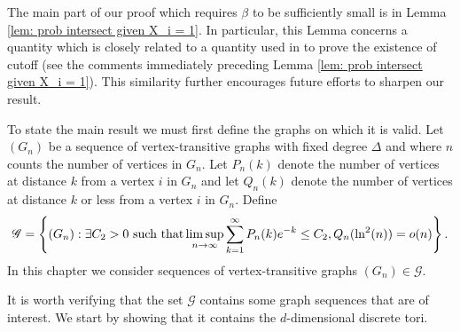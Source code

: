 The main part of our proof which requires $\beta$ to be sufficiently small is in Lemma \ref{lem: prob intersect given X_i = 1}. In particular, this Lemma concerns a quantity which is closely related to a quantity used in \cite{Lubetzky2015-po} to prove the existence of cutoff (see the comments immediately preceding Lemma \ref{lem: prob intersect given X_i = 1}). This similarity further encourages future efforts to sharpen our result.

To state the main result we must first define the graphs on which it is valid. Let $(G_{n})$ be a sequence of vertex-transitive graphs with fixed degree $\Delta$ and where $n$ counts the number of vertices in $G_n$. Let $P_n(k)$ denote the number of vertices at distance $k$ from a vertex $i$ in $G_n$ and let $Q_n(k)$ denote the number of vertices at distance $k$ or less from a vertex $i$ in $G_n$. Define
\begin{equation}
	\mathscr{G} = \left\{(G_n) : \exists C_2 > 0 \text{ such that} \limsup_{n \rightarrow \infty}\sum_{k = 1}^\infty P_n(k)e^{-k} \leq C_2, Q_n(\ln^2(n)) = o(n) \right\}.
	\label{eq:set valid graphs}
\end{equation}
In this chapter we consider sequences of vertex-transitive graphs $(G_n) \in \mathscr{G}$. 

It is worth verifying that the set $\mathscr{G}$ contains some graph sequences that are of interest. We start by showing that it contains the $d$-dimensional discrete tori.

